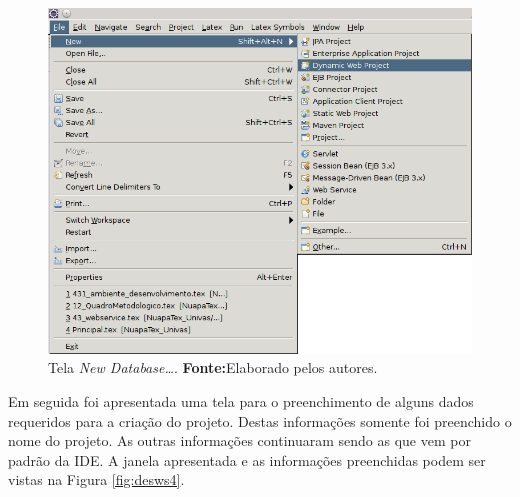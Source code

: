 	
	\begin{figure}[h!]
		\centerline{\includegraphics[scale=0.8]{./imagens/2_q_metodologico/4_procedimentos_resultados/43_webservice/432_desenvolvimento/desws3.png}}
		\caption[Tela \textit{New Database\ldots}]{Tela \textit{New Database\ldots}.
			\textbf{Fonte:}Elaborado pelos autores.}
		\label{fig:desws3}
	\end{figure}
	
	\pagebreak
	
 	\par Em seguida foi apresentada uma tela para o preenchimento de alguns dados
 requeridos para a criação do projeto. Destas informações somente foi preenchido
 o nome do projeto. As outras informações continuaram sendo as que vem por
 padrão da IDE. A janela apresentada e as informações preenchidas podem ser
 vistas na Figura \ref{fig:desws4}.

